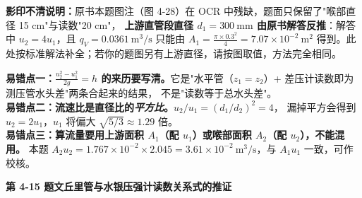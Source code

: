 \begin{tishi}
\textbf{影印不清说明：}原书本题图注（图 4-28）在 OCR 中残缺，题面只保留了"喉部直径 15 cm"与读数"20 cm"，
\textbf{上游直管段直径 $d_1=300\ \mathrm{mm}$ 由原书解答反推}：解答中 $u_2=4u_1$，且 $q_V=0.0361\ \mathrm{m^3/s}$ 只能由
$A_1=\frac{\pi\times0.3^2}{4}=7.07\times10^{-2}\ \mathrm{m^2}$ 得到。此处按标准解法补全；若你的题图另有上游直径，请按图取值，方法完全相同。
\end{tishi}

\begin{yicuo}
\textbf{易错点一：$\frac{u_2^2-u_1^2}{2g}=h$ 的来历要写清。}它是"水平管（$z_1=z_2$）+ 差压计读数即为测压管水头差"两条合起来的结果，
不是"读数等于总水头差"。\\
\textbf{易错点二：流速比是直径比的\emph{平方比}。}$u_2/u_1=(d_1/d_2)^2=4$，
漏掉平方会得到 $u_2=2u_1$，$u_1$ 将偏大 $\sqrt{5/3}\approx1.29$ 倍。\\
\textbf{易错点三：算流量要用上游面积 $A_1$（配 $u_1$）或喉部面积 $A_2$（配 $u_2$），不能混用。}
本题 $A_2u_2=1.767\times10^{-2}\times2.045=3.61\times10^{-2}\ \mathrm{m^3/s}$，与 $A_1u_1$ 一致，可作校核。
\end{yicuo}

\noindent\textbf{第 4-15 题\quad 文丘里管与水银压强计读数关系式的推证}

